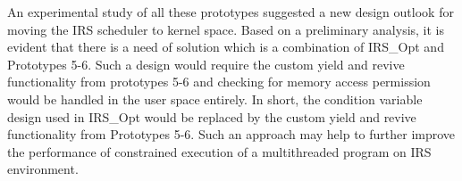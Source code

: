 An experimental study of all these prototypes suggested a new design outlook for moving the IRS scheduler to kernel space. 
Based on a preliminary analysis, it is evident that there is a need of solution which is a combination of IRS\_Opt and Prototypes 5-6. 
Such a design would require the custom yield and revive functionality from prototypes 5-6 and checking for memory access permission would be handled in the user space entirely. 
In short, the condition variable design used in IRS\_Opt would be replaced by the custom yield and revive functionality from Prototypes 5-6. 
Such an approach may help to further improve the performance of constrained execution of a multithreaded program on IRS environment.

